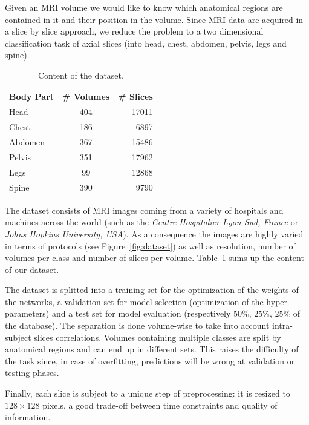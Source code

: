 Given an MRI volume we would like to know which anatomical regions are contained in it and their position in the volume. Since MRI data are acquired in a slice by slice approach, we reduce the problem to a two dimensional classification task of axial slices (into head, chest, abdomen, pelvis, legs and spine).

\begin{table}
	\centering
	\begin{tabular}{ | l | c | r | }
		\hline
		Body Part & \# Volumes & \# Slices \\ \hline
		Head & 404 & 17011 \\
		Chest & 186 & 6897 \\
		Abdomen & 367 & 15486 \\
		Pelvis & 351 & 17962 \\
		Legs & 99 & 12868 \\
		Spine & 390 & 9790 \\
		\hline
	\end{tabular}
	\caption{Content of the dataset.}
	\label{table:dataset}
\end{table}

The dataset consists of MRI images coming from a variety of hospitals and machines across the world (such as the \textit{Centre Hospitalier Lyon-Sud, France} or \textit{ Johns Hopkins University, USA}). As a consequence the images are highly varied in terms of protocols (see Figure~\ref{fig:dataset}) as well as resolution, number of volumes per class and number of slices per volume. Table~\ref{table:dataset} sums up the content of our dataset.

The dataset is splitted into a training set for the optimization of the weights of the networks, a validation set for model selection (optimization of the hyper-parameters) and a test set for model evaluation (respectively $50 \%$, $25 \%$, $25 \%$ of the database). The separation is done volume-wise to take into account intra-subject slices correlations. Volumes containing multiple classes are split by anatomical regions and can end up in different sets. This raises the difficulty of the task since, in case of overfitting, predictions will be wrong at validation or testing phases.


Finally, each slice is subject to a unique step of preprocessing: it is resized to $128 \times 128$ pixels, a good trade-off between time constraints and quality of information.

